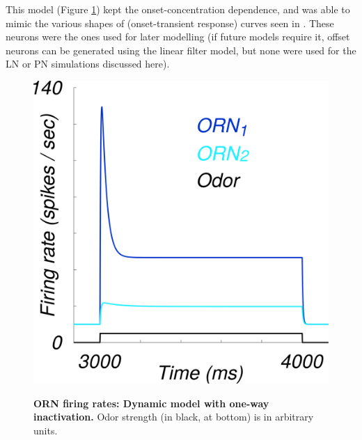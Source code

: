 \documentclass[a4paper,12pt,twoside]{article}
\begin{document}
This model (Figure \ref{fig:orn4}) kept the onset-concentration dependence, and was able to mimic the various shapes of (onset-transient response) curves seen in \cite{Nagel2011}.  These neurons were the ones used for later modelling (if future models require it, offset neurons can be generated using the linear filter model, but none were used for the LN or PN simulations discussed here).

\begin{figure}
\centering
\caption{\textbf{ORN firing rates: Dynamic model with one-way inactivation.}  Odor strength (in black, at bottom) is in arbitrary units.\newline}
\hspace*{-1cm}
\includegraphics[scale=0.4]{2016-08-19_ORN_dynamic_responses.png}
\label{fig:orn4}
\end{figure}
\end{document}
